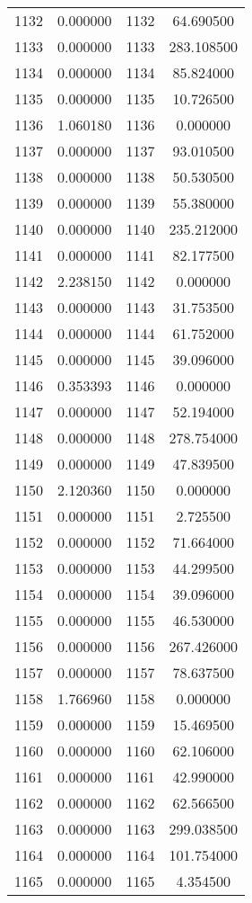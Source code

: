 \documentclass[12pt]{article}
\begin{document}
\begin{longtable}{@{}cccc@{}}
1132 & 0.000000 & 1132 & 64.690500 \\
1133 & 0.000000 & 1133 & 283.108500 \\
1134 & 0.000000 & 1134 & 85.824000 \\
1135 & 0.000000 & 1135 & 10.726500 \\
1136 & 1.060180 & 1136 & 0.000000 \\
1137 & 0.000000 & 1137 & 93.010500 \\
1138 & 0.000000 & 1138 & 50.530500 \\
1139 & 0.000000 & 1139 & 55.380000 \\
1140 & 0.000000 & 1140 & 235.212000 \\
1141 & 0.000000 & 1141 & 82.177500 \\
1142 & 2.238150 & 1142 & 0.000000 \\
1143 & 0.000000 & 1143 & 31.753500 \\
1144 & 0.000000 & 1144 & 61.752000 \\
1145 & 0.000000 & 1145 & 39.096000 \\
1146 & 0.353393 & 1146 & 0.000000 \\
1147 & 0.000000 & 1147 & 52.194000 \\
1148 & 0.000000 & 1148 & 278.754000 \\
1149 & 0.000000 & 1149 & 47.839500 \\
1150 & 2.120360 & 1150 & 0.000000 \\
1151 & 0.000000 & 1151 & 2.725500 \\
1152 & 0.000000 & 1152 & 71.664000 \\
1153 & 0.000000 & 1153 & 44.299500 \\
1154 & 0.000000 & 1154 & 39.096000 \\
1155 & 0.000000 & 1155 & 46.530000 \\
1156 & 0.000000 & 1156 & 267.426000 \\
1157 & 0.000000 & 1157 & 78.637500 \\
1158 & 1.766960 & 1158 & 0.000000 \\
1159 & 0.000000 & 1159 & 15.469500 \\
1160 & 0.000000 & 1160 & 62.106000 \\
1161 & 0.000000 & 1161 & 42.990000 \\
1162 & 0.000000 & 1162 & 62.566500 \\
1163 & 0.000000 & 1163 & 299.038500 \\
1164 & 0.000000 & 1164 & 101.754000 \\
1165 & 0.000000 & 1165 & 4.354500 \\

\end{longtable}
\end{document}
